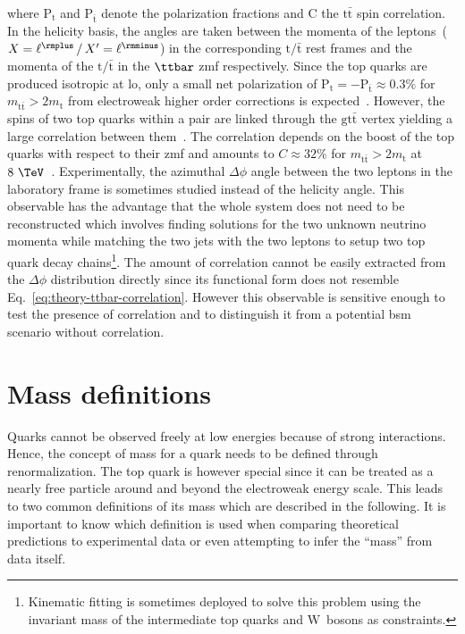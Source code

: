 where $\mathrm{P}_\mathrm{t}$ and $\mathrm{P}_{\bar{\mathrm{t}}}$ denote the polarization fractions and $\mathrm{C}$ the $\mathrm{t\bar{t}}$ spin correlation. In the helicity basis, the angles are taken between the momenta of the leptons~($X=\ell^{\rmplus}\,/\,X^\prime=\ell^{\rmminus}$) in the corresponding $\mathrm{t}/\bar{\mathrm{t}}$ rest frames and the momenta of the $\mathrm{t}/\bar{\mathrm{t}}$ in the $\ttbar$ \gls{zmf} respectively. Since the top quarks are produced isotropic at \gls{lo}, only a small net polarization of $\mathrm{P}_\mathrm{t}=-\mathrm{P}_{\bar{\mathrm{t}}}\approx0.3\%$ for $m_\mathrm{t\bar{t}}>2m_\mathrm{t}$ from electroweak higher order corrections is expected~\cite{Bernreuther:2010ny,Bernreuther:2013aga}. However, the spins of two top quarks within a pair are linked through the $\mathrm{g\mathrm{t}\bar{\mathrm{t}}}$ vertex yielding a large correlation between them~\cite{Mahlon:2010gw}. The correlation depends on the boost of the top quarks with respect to their \gls{zmf} and amounts to $C\approx32\%$ for $m_\mathrm{t\bar{t}}>2m_\mathrm{t}$ at $8~\TeV$~\cite{Bernreuther:2013aga}. Experimentally, the azimuthal $\Delta\phi$ angle between the two leptons in the laboratory frame is sometimes studied instead of the helicity angle. This observable has the advantage that the whole \ttbar system does not need to be reconstructed which involves finding solutions for the two unknown neutrino momenta while matching the two jets with the two leptons to setup two top quark decay chains\footnote{Kinematic fitting is sometimes deployed to solve this problem using the invariant mass of the intermediate top quarks and $\mathrm{W}$~bosons as constraints.}. The amount of correlation cannot be easily extracted from the $\Delta\phi$ distribution directly since its functional form does not resemble Eq.~\ref{eq:theory-ttbar-correlation}. However this observable is sensitive enough to test the presence of \ttbar correlation and to distinguish it from a potential \gls{bsm} scenario without correlation.


\section{Mass definitions}

Quarks cannot be observed freely at low energies because of strong interactions. Hence, the concept of mass for a quark needs to be defined through renormalization. The top quark is however special since it can be treated as a nearly free particle around and beyond the electroweak energy scale. This leads to two common definitions of its mass which are described in the following. It is important to know which definition is used when comparing theoretical predictions to experimental data or even attempting to infer the ``mass'' from data itself.

